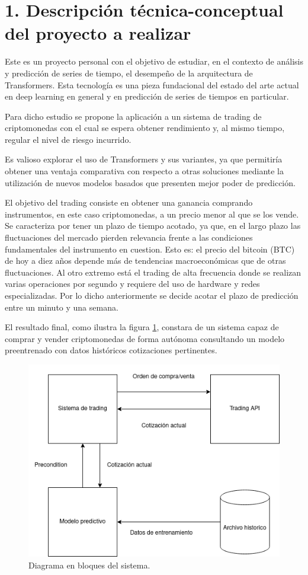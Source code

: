 \documentclass[
    11pt, %
]{charter}
\begin{document}
    \section{1. Descripción técnica-conceptual del proyecto a realizar}
    \label{sec:descripcion}
    Este es un proyecto personal con el objetivo de estudiar, en el contexto de análisis y predicción de series de tiempo,
    el desempeño de la arquitectura de Transformers. Esta tecnología es una pieza fundacional del estado del arte actual
    en deep learning en general y en predicción de series de tiempos en particular.

    Para dicho estudio se propone la aplicación a un sistema de trading de criptomonedas con el cual se espera obtener
    rendimiento y, al mismo tiempo, regular el nivel de riesgo incurrido.

    Es valioso explorar el uso de Transformers y sus variantes, ya que permitiría obtener una ventaja comparativa con
    respecto a otras soluciones mediante la utilización de nuevos modelos basados que presenten mejor poder de predicción.

    El objetivo del trading consiste en obtener una ganancia comprando instrumentos, en este caso criptomonedas, a un precio menor al que se los vende.
    Se caracteriza por tener un plazo de tiempo acotado, ya que, en el largo plazo las fluctuaciones del mercado pierden relevancia
    frente a las condiciones fundamentales del instrumento en cuestion.
    Esto es: el precio del bitcoin (BTC) de hoy a diez años depende más de tendencias macroeconómicas que de otras fluctuaciones.
    Al otro extremo está el trading de alta frecuencia donde se realizan varias operaciones por segundo y requiere del uso de hardware y redes especializadas.
    Por lo dicho anteriormente se decide acotar el plazo de predicción entre un minuto y una semana.

    El resultado final, como ilustra la figura \ref{fig:diagBloques}, constara de un sistema capaz de comprar y vender criptomonedas de forma autónoma consultando
    un modelo preentrenado con datos históricos cotizaciones pertinentes.

    \begin{figure}[htpb]
            \centering
            \includegraphics[width=.65\textwidth]{./Figuras/bloques-tp-final.drawio.png}
            \caption{Diagrama en bloques del sistema.}
            \label{fig:diagBloques}
        \end{figure}
\end{document}
